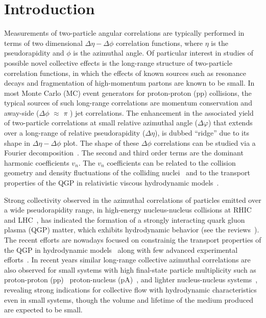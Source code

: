 
\section{Introduction}
\label{sec:intro}

Measurements of two-particle angular correlations are typically performed in terms of two dimensional $\Delta\eta-\Delta\phi$ correlation functions, where $\eta$ is the pseudorapidity and $\phi$ is the azimuthal angle. Of particular interest in studies of possible novel  collective effects is the long-range structure of two-particle correlation functions, in which the effects of known sources such as resonance decays and fragmentation of high-momentum partons are known to be small. In most Monte Carlo (MC) event generators for proton-proton (pp) collisions, the typical sources of such long-range correlations are momentum conservation and away-side ($\Delta\phi$ $\approx$ $\pi$ ) jet correlations.
The enhancement in the associated yield of two-particle correlations at small relative azimuthal angle ($\Delta\varphi$) that extends over a long-range of relative pseudorapidity ($\Delta\eta$), is dubbed ``ridge'' due to its shape in $\Delta\eta-\Delta\phi$ plot.
The shape of these $\Delta\phi$ correlations can be studied via a Fourier decomposition~\cite{Poskanzer:1998yz,Voloshin:2008dg}. The second and third order terms are the dominant harmonic coefficients $v_n$. The $v_n$ coefficients can be related to the collision geometry and density fluctuations of the colliding nuclei~\cite{Alver:2010gr,Alver:2010dn,ALICE:2011ab} and to the transport properties of the QGP in relativistic viscous hydrodynamic models~\cite{Gale:2012rq,Niemi:2015qia,Shen:2014vra,Bernhard:2016tnd,Bernhard2019}.

Strong collectivity observed in the azimuthal correlations of particles emitted over a wide pseudorapidity range, in high-energy nucleus-nucleus collisions at RHIC~\cite{Adams:2005dq,Adcox:2004mh,Arsene:2004fa,Back:2004je} and LHC~\cite{Abelev:2012di, Abelev:2014pua, ATLAS:2011ah}, has indicated the formation of a strongly interacting quark gluon plasma (QGP) matter, which exhibits hydrodynamic behavior (see the reviews~\cite{Romatschke:2007mq,Jeon:2015dfa,Romatschke:2017ejr}). The recent efforts are nowadays focused on constrainig the transport properties of the QGP in hydrodynamic models~\cite{Niemi:2015qia,Bernhard:2016tnd,Bernhard2019} along with few advanced experimental efforts~\cite{ALICE:2016kpq,Acharya:2017gsw,Acharya:2017zfg,Acharya:2020taj}.
In recent years similar long-range collective azimuthal correlations are also observed for small systems with high final-state particle multiplicity such as proton-proton (pp)~\cite{Aad:2015gqa,Khachatryan:2015lva,Khachatryan:2016txc,Acharya:2019vdf} proton-nucleus (pA)~\cite{Abelev:2012ola,Aad:2014lta,Aaboud:2016yar,Khachatryan:2016ibd}, and lighter nucleus-nucleus systems~\cite{PHENIX:2018lia,Aidala:2017ajz}, revealing strong indications for collective flow with hydrodynamic characteristics even in small systems, though the volume and lifetime of the medium produced are expected to be small. 

